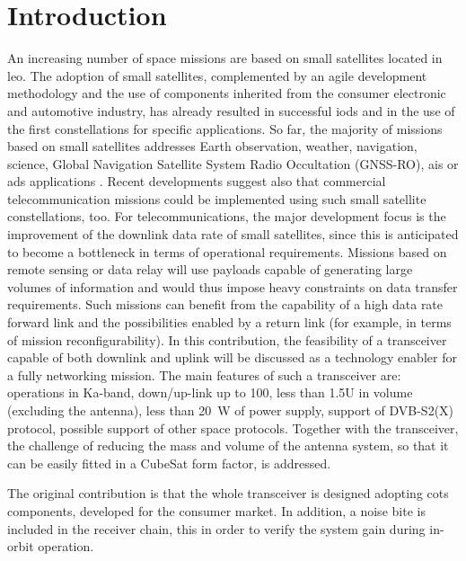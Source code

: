 \documentclass[conference,10pt,a4paper]{IEEEtran}%
\begin{document}
\section{Introduction}
An increasing number of space missions are based on small satellites located in \ac{leo}.
The adoption of small satellites, complemented by an agile development methodology and the use of components inherited from the consumer electronic and automotive industry, has already resulted in successful \glspl{iod} and in the use of the first constellations for specific applications.
So far, the majority of missions based on small satellites addresses Earth observation, weather, navigation, science, Global Navigation Satellite System Radio Occultation (GNSS-RO), \ac{ais} or \ac{ads} applications \cite{Gregorio2016}.
Recent developments suggest also that commercial telecommunication missions could be implemented using such small satellite constellations, too.
For telecommunications, the major development focus is the improvement of the downlink data rate of small satellites, since this is anticipated to become a bottleneck in terms of operational requirements.
Missions based on remote sensing or data relay will use payloads capable of generating large volumes of information and would thus impose heavy constraints on data transfer requirements.
Such missions can benefit from the capability of a high data rate forward link and the possibilities enabled by a return link (for example, in terms of mission reconfigurability).
In this contribution, the feasibility of a transceiver capable of both downlink and uplink will be discussed as a technology enabler for a fully networking mission.
The main features of such a  transceiver are: operations in Ka-band, down/up-link up to \SI{100}{\Mbps}, less than 1.5U in volume (excluding the antenna), less than \SI{20}{\W} of power supply, support of DVB-S2(X) protocol, possible support of other space protocols.
Together with the transceiver, the challenge of reducing the mass and volume of the antenna system, so that it can be easily fitted in a CubeSat form factor, is addressed.

The original contribution is that the whole transceiver is designed adopting \ac{cots} components, developed for the consumer market.
In addition, a noise \ac{bite} is included in the receiver chain, this in order to verify the system gain during in-orbit operation.
\end{document}
